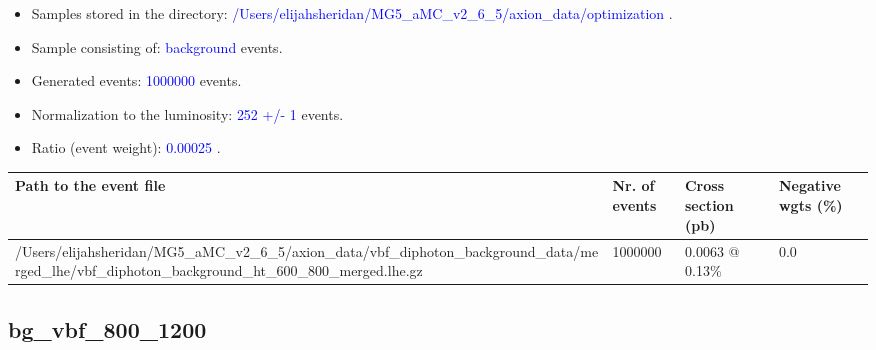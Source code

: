 \documentclass[a4paper, 10pt]{article}
\begin{document}
\begin{itemize}
  \item Samples stored in the directory: \textcolor{blue}{/\-Users/\-elijahsheridan/\-MG5\_aMC\_v2\_6\_5/\-axion\_data/\-optimization} .
   \item Sample consisting of: \textcolor{blue}{background}  events.
   \item Generated events: \textcolor{blue}{1000000 }  events.
   \item Normalization to the luminosity: \textcolor{blue}{252}\textcolor{blue}{ +/\-- }\textcolor{blue}{1 }  events.
   \item Ratio (event weight): \textcolor{blue}{0.00025 } .  
 
\end{itemize}
\begin{table}[H]
  \begin{center}
    \begin{tabular}{|m{55.0mm}|m{25.0mm}|m{30.0mm}|m{30.0mm}|}
      \hline
      {\cellcolor{yellow}         Path to the event file}& {\cellcolor{yellow}         Nr. of events}& {\cellcolor{yellow}         Cross section (pb)}& {\cellcolor{yellow}         Negative wgts (\%)}\\
      \hline
      {\cellcolor{white}          /\-Users/\-elijahsheridan/\-MG5\_aMC\_v2\_6\_5/\-axion\_data/\-vbf\_diphoton\_background\_data/\-merged\_lhe/\-vbf\_diphoton\_background\_ht\_600\_800\_merged.lhe.gz}& {\cellcolor{white}          1000000}& {\cellcolor{white}          0.0063 @ 0.13\%}& {\cellcolor{white}          0.0}\\
\hline
    \end{tabular}
  \end{center}
\end{table}

\subsection{ bg\_vbf\_800\_1200}
\end{document}
